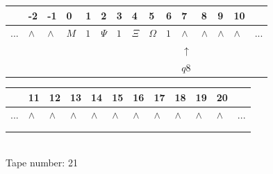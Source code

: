 \documentclass[11pt]{article}
\begin{document}
\begin{table}[H]
\centering
\begin{tabular}{lllllllllllllll}
 & -2 & -1 & 0 & 1 & 2 & 3 & 4 & 5 & 6 & 7 & 8 & 9 & 10 & \\
\hline
$...$ & \multicolumn{1}{|l|}{$\wedge$} & \multicolumn{1}{|l|}{$\wedge$} & \multicolumn{1}{|l|}{$M$} & \multicolumn{1}{|l|}{$1$} & \multicolumn{1}{|l|}{$\Psi$} & \multicolumn{1}{|l|}{$1$} & \multicolumn{1}{|l|}{$\Xi$} & \multicolumn{1}{|l|}{$\Omega$} & \multicolumn{1}{|l|}{$1$} & \multicolumn{1}{|l|}{$\wedge$} & \multicolumn{1}{|l|}{$\wedge$} & \multicolumn{1}{|l|}{$\wedge$} & \multicolumn{1}{|l|}{$\wedge$} & $...$\\
\hline
&  &  &  &  &  &  &  &  &  & $\uparrow$ &  &  &  &  \\
&  &  &  &  &  &  &  &  &  & $ q8 $ &  &  &  &  \\
\end{tabular}
\begin{tabular}{llllllllllll}
 & 11 & 12 & 13 & 14 & 15 & 16 & 17 & 18 & 19 & 20 & \\
\hline
$...$ & \multicolumn{1}{|l|}{$\wedge$} & \multicolumn{1}{|l|}{$\wedge$} & \multicolumn{1}{|l|}{$\wedge$} & \multicolumn{1}{|l|}{$\wedge$} & \multicolumn{1}{|l|}{$\wedge$} & \multicolumn{1}{|l|}{$\wedge$} & \multicolumn{1}{|l|}{$\wedge$} & \multicolumn{1}{|l|}{$\wedge$} & \multicolumn{1}{|l|}{$\wedge$} & \multicolumn{1}{|l|}{$\wedge$} & $...$\\
\hline
&  &  &  &  &  &  &  &  &  &  &  \\
&  &  &  &  &  &  &  &  &  &  &  \\
\end{tabular}
\\
Tape number: 21
\noindent\makebox[\linewidth]{\hdashrule{\textwidth}{1pt}{1pt}}\end{table}
\end{document}
